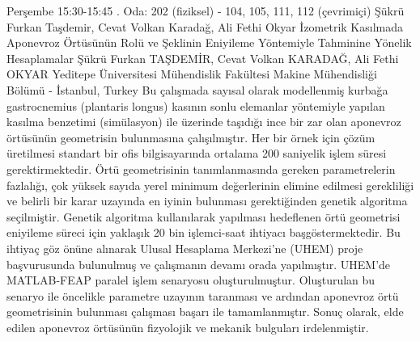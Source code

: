 
    \begin{abstract_basarim}
    {Perşembe 15:30-15:45}
    {.}
    {Oda: 202 (fiziksel) - 104, 105, 111, 112 (çevrimiçi)}
    {Şükrü Furkan Taşdemir, Cevat Volkan Karadağ, Ali Fethi Okyar}
    {İzometrik Kasılmada Aponevroz Örtüsünün Rolü ve Şeklinin Eniyileme Yöntemiyle Tahminine Yönelik Hesaplamalar}
    {%
    Şükrü Furkan TAŞDEMİR, Cevat Volkan KARADAĞ, Ali Fethi OKYAR}
    {%
    }
    {%
    Yeditepe Üniversitesi Mühendislik Fakültesi Makine Mühendisliği Bölümü - İstanbul, Turkey}
    Bu çalışmada sayısal olarak modellenmiş kurbağa gastrocnemius (plantaris longus) kasının sonlu elemanlar yöntemiyle yapılan kasılma benzetimi (simülasyon) ile üzerinde taşıdığı ince bir zar olan aponevroz örtüsünün geometrisin bulunmasına çalışılmıştır. Her bir örnek için çözüm üretilmesi standart bir ofis bilgisayarında ortalama 200 saniyelik işlem süresi gerektirmektedir. Örtü geometrisinin tanımlanmasında gereken parametrelerin fazlalığı, çok yüksek sayıda yerel minimum değerlerinin elimine edilmesi gerekliliği ve belirli bir karar uzayında en iyinin bulunması gerektiğinden genetik algoritma seçilmiştir. Genetik algoritma kullanılarak yapılması hedeflenen örtü geometrisi eniyileme süreci için yaklaşık 20 bin işlemci-saat ihtiyacı başgöstermektedir. Bu ihtiyaç göz önüne alınarak Ulusal Hesaplama Merkezi’ne (UHEM) proje başvurusunda bulunulmuş ve çalışmanın devamı orada yapılmıştır. UHEM’de MATLAB-FEAP paralel işlem senaryosu oluşturulmuştur. Oluşturulan bu senaryo ile öncelikle parametre uzayının taranması ve ardından aponevroz örtü geometrisinin bulunması çalışması başarı ile tamamlanmıştır. Sonuç olarak, elde edilen aponevroz örtüsünün fizyolojik ve mekanik bulguları irdelenmiştir. 
    
    \end{abstract_basarim}
    